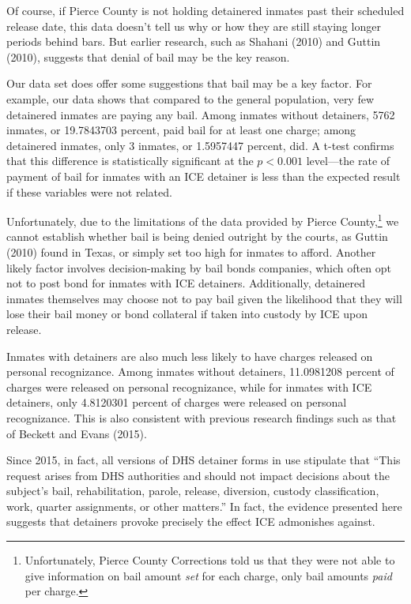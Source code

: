 \documentclass[12pt]{report}\usepackage[]{graphicx}\usepackage[]{color}
\begin{document}
Of course, if Pierce County is not holding detainered inmates past their scheduled release date, this data doesn't tell us why or how they are still staying longer periods behind bars. But earlier research, such as Shahani (2010) and Guttin (2010), suggests that denial of bail may be the key reason.

Our data set does offer some suggestions that bail may be a key factor. For example, our data shows that compared to the general population, very few detainered inmates are paying any bail. Among inmates without detainers, 5762 inmates, or \num{19.7843703}  percent, paid bail for at least one charge; among detainered inmates, only 3 inmates, or \num{1.5957447} percent, did. A t-test confirms that this difference is statistically significant at the $p < 0.001$ level---the rate of payment of bail for inmates with an ICE detainer is less than the expected result if these variables were not related.

Unfortunately, due to the limitations of the data provided by Pierce County,\footnote{ Unfortunately, Pierce County Corrections told us that they were not able to give information on bail amount \emph{set} for each charge, only bail amounts \emph {paid} per charge.} we cannot establish whether bail is being denied outright by the courts, as Guttin (2010) found in Texas, or simply set too high for inmates to afford. Another likely factor involves decision-making by bail bonds companies, which often opt not to post bond for inmates with ICE detainers. Additionally, detainered inmates themselves may choose not to pay bail given the likelihood that they will lose their bail money or bond collateral if taken into custody by ICE upon release.

Inmates with detainers are also much less likely to have charges released on personal recognizance. Among inmates without detainers, \num{11.0981208} percent of charges were released on personal recognizance, while for inmates with ICE detainers, only \num{4.8120301} percent of charges were released on personal recognizance. This is also consistent with previous research findings such as that of Beckett and Evans (2015).

Since 2015, in fact, all versions of DHS detainer forms in use stipulate that ``This request arises from DHS authorities and should not impact decisions about the subject's bail, rehabilitation, parole, release, diversion, custody classification, work, quarter assignments, or other matters.'' In fact, the evidence presented here suggests that detainers provoke precisely the effect ICE admonishes against.
\end{document}
